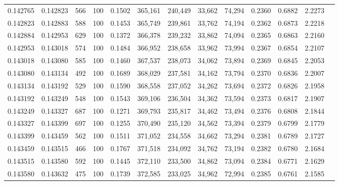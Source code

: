 \begin{tabular}{rrrrrrrrrrrrr}
0.142765 & 0.142823 &   566 & 100 &                                     0.1502 & 365,161 & 240,449 &  33,662 &  74,294 & 0.2360 & 0.6882 & 2.2273 \\
0.142823 & 0.142883 &   588 & 100 &                                     0.1453 & 365,749 & 239,861 &  33,762 &  74,194 & 0.2362 & 0.6873 & 2.2218 \\
0.142884 & 0.142953 &   629 & 100 &                                     0.1372 & 366,378 & 239,232 &  33,862 &  74,094 & 0.2365 & 0.6863 & 2.2160 \\
0.142953 & 0.143018 &   574 & 100 &                                     0.1484 & 366,952 & 238,658 &  33,962 &  73,994 & 0.2367 & 0.6854 & 2.2107 \\
0.143018 & 0.143080 &   585 & 100 &                                     0.1460 & 367,537 & 238,073 &  34,062 &  73,894 & 0.2369 & 0.6845 & 2.2053 \\
0.143080 & 0.143134 &   492 & 100 &                                     0.1689 & 368,029 & 237,581 &  34,162 &  73,794 & 0.2370 & 0.6836 & 2.2007 \\
0.143134 & 0.143192 &   529 & 100 &                                     0.1590 & 368,558 & 237,052 &  34,262 &  73,694 & 0.2372 & 0.6826 & 2.1958 \\
0.143192 & 0.143249 &   548 & 100 &                                     0.1543 & 369,106 & 236,504 &  34,362 &  73,594 & 0.2373 & 0.6817 & 2.1907 \\
0.143249 & 0.143327 &   687 & 100 &                                     0.1271 & 369,793 & 235,817 &  34,462 &  73,494 & 0.2376 & 0.6808 & 2.1844 \\
0.143327 & 0.143399 &   697 & 100 &                                     0.1255 & 370,490 & 235,120 &  34,562 &  73,394 & 0.2379 & 0.6799 & 2.1779 \\
0.143399 & 0.143459 &   562 & 100 &                                     0.1511 & 371,052 & 234,558 &  34,662 &  73,294 & 0.2381 & 0.6789 & 2.1727 \\
0.143459 & 0.143515 &   466 & 100 &                                     0.1767 & 371,518 & 234,092 &  34,762 &  73,194 & 0.2382 & 0.6780 & 2.1684 \\
0.143515 & 0.143580 &   592 & 100 &                                     0.1445 & 372,110 & 233,500 &  34,862 &  73,094 & 0.2384 & 0.6771 & 2.1629 \\
0.143580 & 0.143632 &   475 & 100 &                                     0.1739 & 372,585 & 233,025 &  34,962 &  72,994 & 0.2385 & 0.6761 & 2.1585 \\

\end{tabular}
